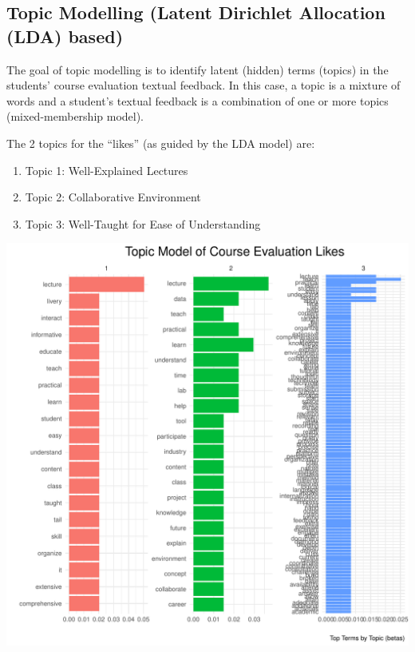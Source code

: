 \documentclass[
]{article}
\begin{document}
\newpage

\subsection{Topic Modelling (Latent Dirichlet Allocation (LDA)
based)}\label{topic-modelling-latent-dirichlet-allocation-lda-based}

The goal of topic modelling is to identify latent (hidden) terms
(topics) in the students' course evaluation textual feedback. In this
case, a topic is a mixture of words and a student's textual feedback is
a combination of one or more topics (mixed-membership model).

The 2 topics for the ``likes'' (as guided by the LDA model) are:

\begin{enumerate}
\def\labelenumi{\arabic{enumi}.}
\item
  Topic 1: Well-Explained Lectures
\item
  Topic 2: Collaborative Environment
\item
  Topic 3: Well-Taught for Ease of Understanding
\end{enumerate}

\includegraphics{10.b.BBT4206-End-SemesterCourseEvaluation-20230821-20231128-BI2-BBIT4-2_files/figure-latex/visualizations_for_likes_topic_modelling-1.pdf}
\end{document}
